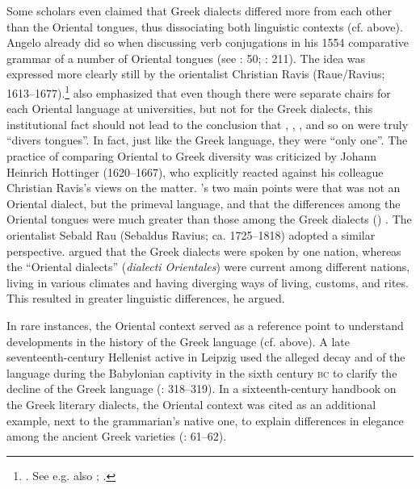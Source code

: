 Some scholars even claimed that Greek dialects differed more from each other than the Oriental tongues, thus dissociating both linguistic contexts (cf.  above). Angelo \citet[34]{Canini1554} already did so when discussing verb conjugations in his 1554 comparative grammar of a number of Oriental tongues (see \citealt{Contini1994}: 50; \citealt{Kessler-mesguich2013}: 211). The idea was expressed more clearly still by the orientalist Christian Ravis (Raue/Ravius; 1613–1677).\footnote{\citet[*.2\textsc{\textsuperscript{r}}]{Ravis1646}. See e.g. also \citet[51--52]{Hunt1739}; \citet[\textsc{xxvi}]{Groddeck1747}.} \citet[48]{Ravis1650} also emphasized that even though there were separate chairs for each Oriental language at universities, but not for the Greek dialects, this institutional fact should not lead to the conclusion that , , , and so on were truly “divers tongues”. In fact, just like the Greek language, they were “only one”. The practice of comparing Oriental to Greek diversity was criticized by Johann Heinrich Hottinger (1620–1667), who explicitly reacted against his colleague Christian Ravis’s views on the matter. \citeauthor{Hottinger1661}'s two main points were that  was not an Oriental dialect, but the primeval language, and that the differences among the Oriental tongues were much greater than those among the Greek dialects (\citeyear[a.3\textsc{\textsuperscript{v}}–a.4\textsc{\textsuperscript{r}}]{Hottinger1661}) . The  orientalist Sebald Rau (Sebaldus Ravius; ca. 1725–1818) adopted a similar perspective. \citet[20--21]{Rau1770} argued that the Greek dialects were spoken by one nation, whereas the “Oriental dialects” (\textit{dialecti Orientales}) were current among different nations, living in various climates and having diverging ways of living, customs, and rites. This resulted in greater linguistic differences, he argued.

In rare instances, the Oriental context served as a reference point to understand developments in the history of the Greek language (cf.  above). A late seventeenth-century Hellenist active in Leipzig used the alleged decay and  of the  language during the Babylonian captivity in the sixth century \textsc{bc} to clarify the decline of the Greek language (\citealt{Eling1691}: 318–319). In a sixteenth-century handbook on the Greek literary dialects, the Oriental context was cited as an additional example, next to the grammarian’s native one, to explain differences in elegance among the ancient Greek varieties (\citealt{Walper1589}: 61–62).

